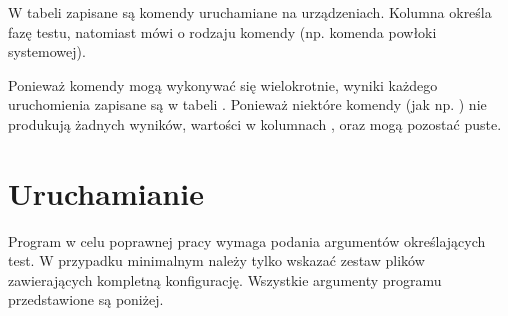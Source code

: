 \documentclass[00-praca-magisterska.tex]{subfiles}
\begin{document}
W tabeli  zapisane są komendy uruchamiane na urządzeniach.
Kolumna  określa fazę testu, natomiast  mówi o rodzaju
komendy (np. komenda powłoki systemowej).

Ponieważ komendy mogą wykonywać się wielokrotnie, wyniki każdego uruchomienia
zapisane są w tabeli . Ponieważ niektóre komendy (jak np.
) nie produkują żadnych wyników, wartości w kolumnach
,  oraz  mogą pozostać puste.

\section{Uruchamianie}

Program  w celu poprawnej pracy wymaga podania argumentów
określających test. W przypadku minimalnym należy tylko wskazać zestaw plików
zawierających kompletną konfigurację. Wszystkie argumenty programu przedstawione
są poniżej.
\end{document}
